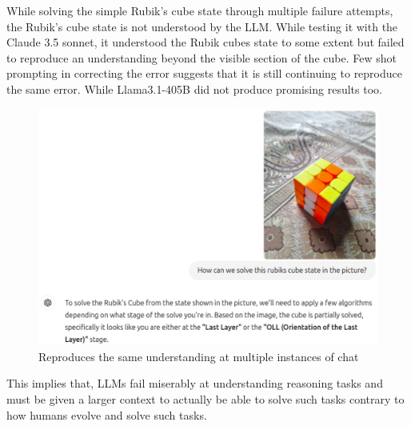 \documentclass[pdflatex,sn-mathphys-num]{sn-jnl}%
\theoremstyle{thmstyleone}%
\theoremstyle{thmstyletwo}%
\theoremstyle{thmstylethree}%
\begin{document}
\begin{appendices}
While solving the simple Rubik's cube state through multiple failure attempts, the Rubik's cube state is not understood by the LLM. While testing it with the Claude 3.5 sonnet, it understood the Rubik cubes state to some extent but failed to reproduce an understanding beyond the visible section of the cube. Few shot prompting in correcting the error suggests that it is still continuing to reproduce the same error. While Llama3.1-405B did not produce promising results too.
\begin{figure}[H]
    \centering
    \includegraphics[scale=0.60]{figures/rubikscubefai.eps}
    \captionsetup{justification=centering}
    \caption{Reproduces the same understanding at multiple instances of chat}
    \label{fig1}
\end{figure}

This implies that, LLMs fail miserably at understanding reasoning tasks and must be given a larger context to actually be able to solve such tasks contrary to how humans evolve and solve such tasks.


\end{appendices}
\end{document}
